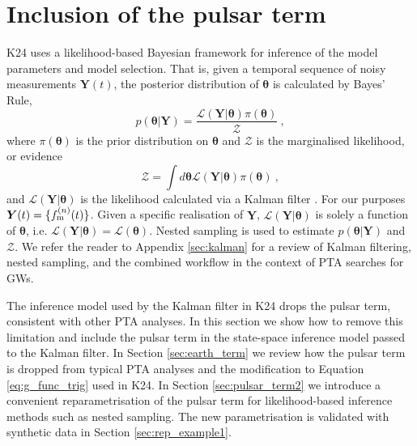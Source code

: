 \documentclass[fleqn,usenatbib,useAMS]{mnras}
\begin{document}
\section{Inclusion of the pulsar term}\label{sec:pulsar_term}
K24 uses a likelihood-based Bayesian framework for inference of the model parameters and model selection. That is, given a temporal sequence of noisy measurements $\boldsymbol{Y}(t)$, the posterior distribution of $\boldsymbol{\theta}$ is calculated by Bayes' Rule,
\begin{equation}
	p(\boldsymbol{\theta} | \boldsymbol{Y}) = \frac{\mathcal{L}(\boldsymbol{Y} | \boldsymbol{\theta}) \pi(\boldsymbol{\theta})}{\mathcal{Z}} \ ,
\end{equation}
where $\pi(\boldsymbol{\theta})$ is the prior distribution on $\boldsymbol{\theta}$ and $\mathcal{Z}$ is the marginalised likelihood, or evidence
\begin{equation}
	\mathcal{Z} = \int d \boldsymbol{\theta} \mathcal{L}(\boldsymbol{Y} | \boldsymbol{\theta})  \pi(\boldsymbol{\theta})  \ , \label{eq:model_evidence}
\end{equation}
and $\mathcal{L}(\boldsymbol{Y}| \boldsymbol{\theta})$ is the likelihood calculated via a Kalman filter \citep{Kalman1}. For our purposes ${\boldsymbol{Y}}(t) = \{ f_{\rm m}^{(n)}(t) \}$. Given a specific realisation of $\boldsymbol{Y}$, $\mathcal{L}(\boldsymbol{Y}| \boldsymbol{\theta})$ is solely a function of $\boldsymbol{\theta}$, i.e. $\mathcal{L}(\boldsymbol{Y}| \boldsymbol{\theta}) = \mathcal{L}(\boldsymbol{\theta})$. Nested sampling \citep{Skilling} is used to estimate $p(\boldsymbol{\theta} | \boldsymbol{Y})$ and $\mathcal{Z}$. We refer the reader to Appendix  \ref{sec:kalman} for a review of Kalman filtering, nested sampling, and the combined workflow in the context of PTA searches for GWs. \newline 

The inference model used by the Kalman filter in K24 drops the pulsar term, consistent with other PTA analyses. In this section we show how to remove this limitation and include the pulsar term in the state-space inference model passed to the Kalman filter. In Section \ref{sec:earth_term} we review how the pulsar term is dropped from typical PTA analyses and the modification to Equation \eqref{eq:g_func_trig} used in K24. In Section \ref{sec:pulsar_term2} we introduce a convenient reparametrisation of the pulsar term for likelihood-based inference methods such as nested sampling. The new parametrisation is validated with synthetic data in Section \ref{sec:rep_example1}.
\end{document}
